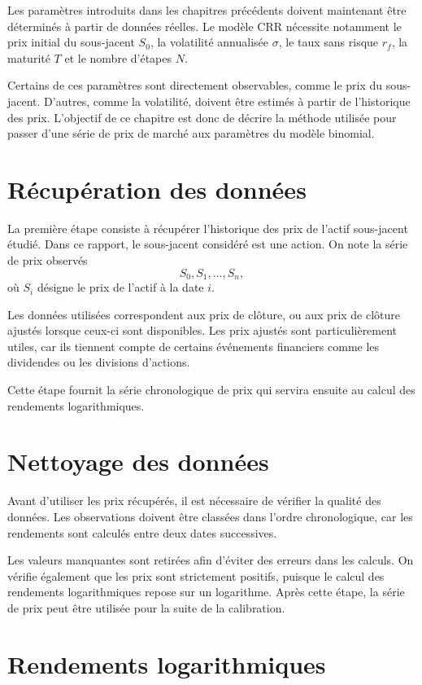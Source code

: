 \documentclass[12pt,a4paper]{report}
\begin{document}
Les paramètres introduits dans les chapitres précédents doivent maintenant être déterminés à partir de données réelles. Le modèle CRR nécessite notamment le prix initial du sous-jacent $S_0$, la volatilité annualisée $\sigma$, le taux sans risque $r_f$, la maturité $T$ et le nombre d'étapes $N$.

Certains de ces paramètres sont directement observables, comme le prix du sous-jacent. D'autres, comme la volatilité, doivent être estimés à partir de l'historique des prix. L'objectif de ce chapitre est donc de décrire la méthode utilisée pour passer d'une série de prix de marché aux paramètres du modèle binomial.

\section{Récupération des données}

La première étape consiste à récupérer l'historique des prix de l'actif sous-jacent étudié. Dans ce rapport, le sous-jacent considéré est une action. On note la série de prix observés
\[
S_0, S_1, \ldots, S_n,
\]
où $S_i$ désigne le prix de l'actif à la date $i$.

Les données utilisées correspondent aux prix de clôture, ou aux prix de clôture ajustés lorsque ceux-ci sont disponibles. Les prix ajustés sont particulièrement utiles, car ils tiennent compte de certains événements financiers comme les dividendes ou les divisions d'actions.

Cette étape fournit la série chronologique de prix qui servira ensuite au calcul des rendements logarithmiques.

\section{Nettoyage des données}

Avant d'utiliser les prix récupérés, il est nécessaire de vérifier la qualité des données. Les observations doivent être classées dans l'ordre chronologique, car les rendements sont calculés entre deux dates successives.

Les valeurs manquantes sont retirées afin d'éviter des erreurs dans les calculs. On vérifie également que les prix sont strictement positifs, puisque le calcul des rendements logarithmiques repose sur un logarithme. Après cette étape, la série de prix peut être utilisée pour la suite de la calibration.

\section{Rendements logarithmiques}
\end{document}

